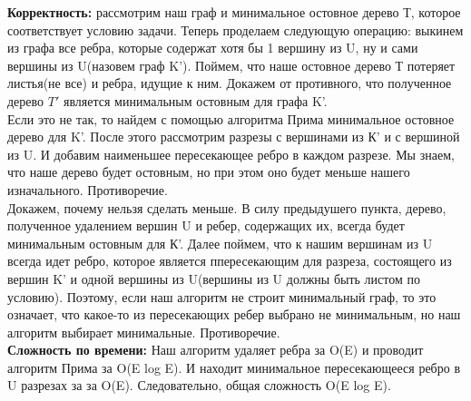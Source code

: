 \documentclass[a4paper,12pt]{article}
\begin{document}
\textbf{Корректность:} рассмотрим наш граф и минимальное остовное дерево Т, которое соответствует условию задачи. Теперь проделаем следующую операцию: выкинем из графа все ребра, которые содержат хотя бы 1 вершину из U, ну и сами вершины из U(назовем граф K'). Поймем, что наше остовное дерево Т потеряет листья(не все)
 и ребра, идущие к ним. Докажем от противного, что полученное дерево $T'$ является минимальным остовным для графа K'.\\
Если это не так, то найдем с помощью алгоритма Прима минимальное остовное дерево для K'. После этого рассмотрим разрезы с вершинами из К' и с вершиной из U. И добавим наименьшее пересекающее ребро в каждом разрезе. Мы знаем, что наше дерево будет остовным, но при этом оно будет меньше нашего изначального. Противоречие. \\
Докажем, почему нельзя сделать меньше. В силу предыдушего пункта, дерево, полученное удалением вершин U и ребер, содержащих их, всегда будет минимальным остовным для К'. Далее поймем, что к нашим вершинам из U всегда идет ребро, которое является ппересекающим для разреза, состоящего из вершин K' и одной вершины из U(вершины из U должны быть листом по условию). Поэтому, если наш алгоритм не строит минимальный граф, то это означает, что какое-то из пересекающих ребер выбрано не минимальным, но наш алгоритм выбирает минимальные. Противоречие.\\
\textbf{Сложность по времени:} Наш алгоритм удаляет ребра за O(E) и проводит алгоритм Прима за O(E log E). И находит минимальное пересекающееся ребро в U разрезах за за O(E). Следовательно, общая сложность O(E log E).\\
\end{document}
